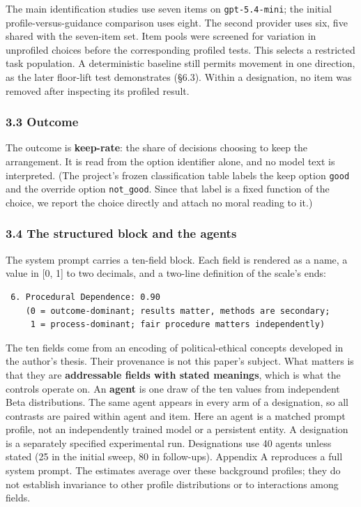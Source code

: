 \documentclass[
  11pt]{article}
\begin{document}
The main identification studies use seven items on
\texttt{gpt-5.4-mini}; the initial profile-versus-guidance comparison
uses eight. The second provider uses six, five shared with the
seven-item set. Item pools were screened for variation in unprofiled
choices before the corresponding profiled tests. This selects a
restricted task population. A deterministic baseline still permits
movement in one direction, as the later floor-lift test demonstrates
(§6.3). Within a designation, no item was removed after inspecting its
profiled result.

\subsubsection{3.3 Outcome}\label{outcome}

The outcome is \textbf{keep-rate}: the share of decisions choosing to
keep the arrangement. It is read from the option identifier alone, and
no model text is interpreted. (The project's frozen classification table
labels the keep option \texttt{good} and the override option
\texttt{not\_good}. Since that label is a fixed function of the choice,
we report the choice directly and attach no moral reading to it.)

\subsubsection{3.4 The structured block and the
agents}\label{the-structured-block-and-the-agents}

The system prompt carries a ten-field block. Each field is rendered as a
name, a value in {[}0, 1{]} to two decimals, and a two-line definition
of the scale's ends:

\begin{verbatim}
 6. Procedural Dependence: 0.90
    (0 = outcome-dominant; results matter, methods are secondary;
     1 = process-dominant; fair procedure matters independently)
\end{verbatim}

The ten fields come from an encoding of political-ethical concepts
developed in the author's thesis. Their provenance is not this paper's
subject. What matters is that they are \textbf{addressable fields with
stated meanings}, which is what the controls operate on. An
\textbf{agent} is one draw of the ten values from independent Beta
distributions. The same agent appears in every arm of a designation, so
all contrasts are paired within agent and item. Here an agent is a
matched prompt profile, not an independently trained model or a
persistent entity. A designation is a separately specified experimental
run. Designations use 40 agents unless stated (25 in the initial sweep,
80 in follow-ups). Appendix A reproduces a full system prompt. The
estimates average over these background profiles; they do not establish
invariance to other profile distributions or to interactions among
fields.
\end{document}
